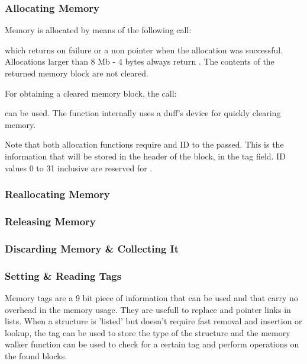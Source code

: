 \subsubsection{Allocating Memory}

Memory is allocated by means of the following call:


which returns  on failure or a non  pointer when the allocation was
successful. Allocations larger than 8 Mb - 4 bytes always return . The
contents of the returned memory block are not cleared.

For obtaining a cleared memory block, the call:


can be used. The function internally uses a duff's device for quickly
clearing memory.

Note that both allocation functions require and ID to the passed. This is
the information that will be stored in the header of the block, in the tag
field. ID values 0 to 31 inclusive are reserved for \oswald.

\subsubsection{Reallocating Memory}


\subsubsection{Releasing Memory}


\subsubsection{Discarding Memory \& Collecting It}



\subsubsection{Setting \& Reading Tags}

Memory tags are a 9 bit piece of information that can be used and that carry
no overhead in the memory usage. They are usefull to replace 
and  pointer links in lists. When a structure is 'listed'
but doesn't require fast removal and insertion or lookup, the tag can be
used to store the type of the structure and the memory walker function can
be used to check for a certain tag and perform operations on the found
blocks. 

